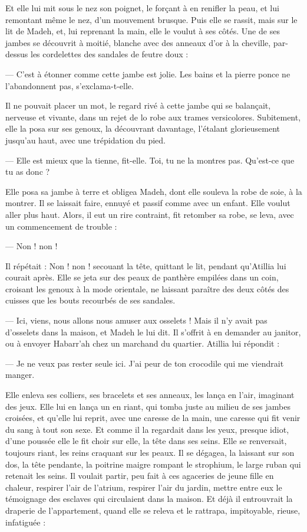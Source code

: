 \documentclass[a4paper, 11pt, oneside, polutonikogreek, french]{article}
\begin{document}
Et elle lui mit sous le nez son poignet, le forçant à en renifler la peau, et lui remontant même le nez, d'un mouvement brusque. Puis elle se rassit, mais sur le lit de Madeh, et, lui reprenant la main, elle le voulut à ses côtés. Une de ses jambes se découvrit à moitié, blanche avec des anneaux d'or à la cheville, par-dessus les cordelettes des sandales de feutre doux :

--- C'est à étonner comme cette jambe est jolie. Les bains et la pierre ponce ne l'abandonnent pas, s'exclama-t-elle.

Il ne pouvait placer un mot, le regard rivé à cette jambe qui se balançait, nerveuse et vivante, dans un rejet de lo robe aux trames versicolores. Subitement, elle la posa sur ses genoux, la découvrant davantage, l'étalant glorieusement jusqu'au haut, avec une trépidation du pied.

--- Elle est mieux que la tienne, fit-elle. Toi, tu ne la montres pas. Qu'est-ce que tu as donc ?

Elle posa sa jambe à terre et obligea Madeh, dont elle souleva la robe de soie, à la montrer. Il se laissait faire, ennuyé et passif comme avec un enfant. Elle voulut aller plus haut. Alors, il eut un rire contraint, fit retomber sa robe, se leva, avec un commencement de trouble :

--- Non ! non !

Il répétait : Non ! non ! secouant la tête, quittant le lit, pendant qu'Atillia lui courait après. Elle se jeta sur des peaux de panthère empilées dans un coin, croisant les genoux à la mode orientale, ne laissant paraître des deux côtés des cuisses que les bouts recourbés de ses sandales.

--- Ici, viens, nous allons nous amuser aux osselets ! Mais il n'y avait pas d'osselets dans la maison, et Madeh le lui dit. Il s'offrit à en demander au janitor, ou à envoyer Habarr’ah chez un marchand du quartier. Atillia lui répondit :

--- Je ne veux pas rester seule ici. J'ai peur de ton crocodile qui me viendrait manger.

Elle enleva ses colliers, ses bracelets et ses anneaux, les lança en l'air, imaginant des jeux. Elle lui en lança un en riant, qui tomba juste au milieu de ses jambes croisées, et qu'elle lui reprit, avec une caresse de la main, une caresse qui fit venir du sang à tout son sexe. Et comme il la regardait dans les yeux, presque idiot, d'une poussée elle le fit choir sur elle, la tête dans ses seins. Elle se renversait, toujours riant, les reins craquant sur les peaux. Il se dégagea, la laissant sur son dos, la tête pendante, la poitrine maigre rompant le strophium, le large ruban qui retenait les seins. Il voulait partir, peu fait à ces agaceries de jeune fille en chaleur, respirer l'air de l'atrium, respirer l'air du jardin, mettre entre eux le témoignage des esclaves qui circulaient dans la maison. Et déjà il entrouvrait la draperie de l'appartement, quand elle se releva et le rattrapa, impitoyable, rieuse, infatiguée :
\end{document}
